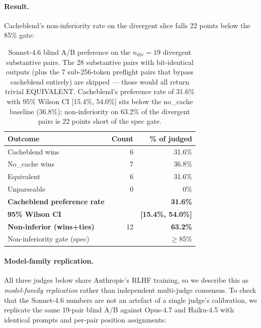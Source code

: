 \paragraph{Result.} Cacheblend's non-inferiority rate on the divergent
slice falls 22 points below the 85\% gate:

\begin{table}[h]
\small
\centering
\begin{tabular}{lrr}
\toprule
Outcome & Count & \% of judged \\
\midrule
Cacheblend wins & 6 & 31.6\% \\
No\_cache wins & 7 & 36.8\% \\
Equivalent & 6 & 31.6\% \\
Unparseable & 0 & 0\% \\
\midrule
\textbf{Cacheblend preference rate} & & \textbf{31.6\%} \\
\textbf{95\% Wilson CI} & & \textbf{[15.4\%, 54.0\%]} \\
\textbf{Non-inferior (wins+ties)} & 12 & \textbf{63.2\%} \\
Non-inferiority gate (spec) & & $\geq$85\% \\
\bottomrule
\end{tabular}
\caption{Sonnet-4.6 blind A/B preference on the $n_{\text{div}}{=}19$
divergent substantive pairs. The 28 substantive pairs with bit-identical
outputs (plus the 7 sub-256-token preflight pairs that bypass cacheblend
entirely) are skipped --- those would all return trivial EQUIVALENT.
Cacheblend's preference rate of 31.6\% with 95\% Wilson CI
[15.4\%, 54.0\%] sits below the no\_cache baseline (36.8\%);
non-inferiority on 63.2\% of the divergent pairs is 22 points short
of the spec gate.}
\label{tab:judge}
\end{table}

\paragraph{Model-family replication.} All three judges below share
Anthropic's RLHF training, so we describe this as
\emph{model-family replication} rather than independent
multi-judge consensus. To check that the
Sonnet-4.6 numbers are not an artefact of a single judge's calibration,
we replicate the same 19-pair blind A/B against Opus-4.7 and Haiku-4.5
with identical prompts and per-pair position assignments:

